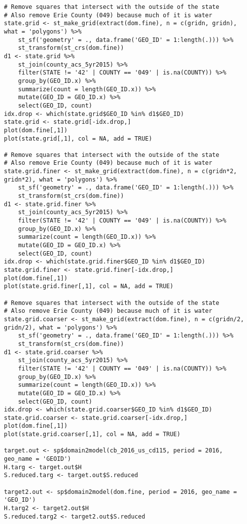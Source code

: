 \documentclass[12pt]{article}
\begin{document}
\begin{scriptsize}
\begin{verbatim}
# Remove squares that intersect with the outside of the state
# Also remove Erie County (049) because much of it is water
state.grid <- st_make_grid(extract(dom.fine), n = c(gridn, gridn), what = 'polygons') %>%
    st_sf('geometry' = ., data.frame('GEO_ID' = 1:length(.))) %>%
    st_transform(st_crs(dom.fine))
d1 <- state.grid %>%
    st_join(county_acs_5yr2015) %>%
    filter(STATE != '42' | COUNTY == '049' | is.na(COUNTY)) %>%
    group_by(GEO_ID.x) %>%
    summarize(count = length(GEO_ID.x)) %>%
    mutate(GEO_ID = GEO_ID.x) %>%
    select(GEO_ID, count)
idx.drop <- which(state.grid$GEO_ID %in% d1$GEO_ID)
state.grid <- state.grid[-idx.drop,]
plot(dom.fine[,1])
plot(state.grid[,1], col = NA, add = TRUE)

# Remove squares that intersect with the outside of the state
# Also remove Erie County (049) because much of it is water
state.grid.finer <- st_make_grid(extract(dom.fine), n = c(gridn*2, gridn*2), what = 'polygons') %>%
    st_sf('geometry' = ., data.frame('GEO_ID' = 1:length(.))) %>%
    st_transform(st_crs(dom.fine))
d1 <- state.grid.finer %>%
    st_join(county_acs_5yr2015) %>%
    filter(STATE != '42' | COUNTY == '049' | is.na(COUNTY)) %>%
    group_by(GEO_ID.x) %>%
    summarize(count = length(GEO_ID.x)) %>%
    mutate(GEO_ID = GEO_ID.x) %>%
    select(GEO_ID, count)
idx.drop <- which(state.grid.finer$GEO_ID %in% d1$GEO_ID)
state.grid.finer <- state.grid.finer[-idx.drop,]
plot(dom.fine[,1])
plot(state.grid.finer[,1], col = NA, add = TRUE)

# Remove squares that intersect with the outside of the state
# Also remove Erie County (049) because much of it is water
state.grid.coarser <- st_make_grid(extract(dom.fine), n = c(gridn/2, gridn/2), what = 'polygons') %>%
    st_sf('geometry' = ., data.frame('GEO_ID' = 1:length(.))) %>%
    st_transform(st_crs(dom.fine))
d1 <- state.grid.coarser %>%
    st_join(county_acs_5yr2015) %>%
    filter(STATE != '42' | COUNTY == '049' | is.na(COUNTY)) %>%
    group_by(GEO_ID.x) %>%
    summarize(count = length(GEO_ID.x)) %>%
    mutate(GEO_ID = GEO_ID.x) %>%
    select(GEO_ID, count)
idx.drop <- which(state.grid.coarser$GEO_ID %in% d1$GEO_ID)
state.grid.coarser <- state.grid.coarser[-idx.drop,]
plot(dom.fine[,1])
plot(state.grid.coarser[,1], col = NA, add = TRUE)

target.out <- sp$domain2model(cb_2016_us_cd115, period = 2016, geo_name = 'GEOID')
H.targ <- target.out$H
S.reduced.targ <- target.out$S.reduced

target2.out <- sp$domain2model(dom.fine, period = 2016, geo_name = 'GEO_ID')
H.targ2 <- target2.out$H
S.reduced.targ2 <- target2.out$S.reduced


\end{verbatim}
\end{scriptsize}
\end{document}
